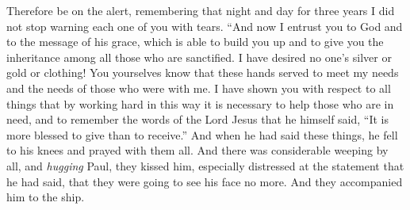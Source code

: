 \begin{biblechapter}
\verse Therefore be on the alert, remembering that night and day for three years I did not stop warning each one of you with tears.
\verse “And now I entrust you to God and to the message of his grace, which is able to build you up and to give you the inheritance among all those who are sanctified.
\verse I have desired no one’s silver or gold or clothing!
\verse You yourselves know that these hands served to meet my needs and the needs of those who were with me.
\verse I have shown you with respect to all things that by working hard in this way it is necessary to help those who are in need, and to remember the words of the Lord Jesus that he himself said, “It is more blessed to give than to receive.”
\verse And when he had said these things, he fell to his knees and prayed with them all.
\verse And there was considerable weeping by all, and \textit{hugging} Paul, they kissed him,
\verse especially distressed at the statement that he had said, that they were going to see his face no more. And they accompanied him to the ship.
\end{biblechapter}

